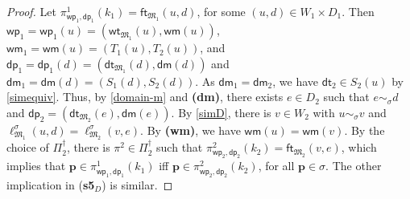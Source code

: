 \documentclass{lmcs} %
\theoremstyle{plain}\newtheorem{satz}[thm]{Satz} %
\newcommand{\wt}{\mathsf{wt}}
\newcommand{\dt}{\mathsf{dt}}
\newcommand{\ft}{\mathsf{ft}}
\newcommand{\wm}{\mathsf{wm}}
\newcommand{\dm}{\mathsf{dm}}
\newcommand{\iwp}{\mathsf{wp}_i}
\newcommand{\idp}{\mathsf{dp}_i}
\newcommand{\owp}{\mathsf{wp}_1}
\newcommand{\twp}{\mathsf{wp}_2}
\newcommand{\odp}{\mathsf{dp}_1}
\newcommand{\tdp}{\mathsf{dp}_2}
\newcommand{\fform}[1]{\boldsymbol{#1}}
\newcommand{\pvar}{\fform{p}}
\begin{document}
\begin{proof}
	Let $\pi^1_{\owp,\odp}(k_1) = \ft_{\mathfrak{M}_{1}}(u,d)$, for some $(u,d)\in W_{1} \times D_{1}$. Then $\owp = \owp(u) = (\wt_{\mathfrak M_1}(u), \wm(u) )$, $\wm_1 = \wm(u) = (T_1(u), T_2(u))$, and $\odp = \odp(d) = (\dt_{\mathfrak M_1}(d), \dm(d) )$ and $\dm_1 = \dm(d) = (S_1(d), S_2(d))$. 
As $\dm_1 = \dm_2$, we have $\dt_2 \in S_2(u)$ by \eqref{simequiv}. Thus, by \eqref{domain-m} and  {\bf (dm)}, 
	there exists $e \in D_{2}$ such that $e\sim_{\sigma} d$ and $\tdp = (\dt_{\mathfrak M_2}(e), \dm(e) )$.
	By \eqref{simD}, 
	there is $v \in W_2$ with $u \sim_\sigma v$ and $\ell^\sigma_{\mathfrak M_1}(u,d)= \ell^\sigma_{\mathfrak M_2}(v,e)$. By {\bf (wm)}, we have $\wm(u) = \wm(v)$. By the choice of $\Pi_{2}^{\dag}$, there is $\pi^{2}\in \Pi_{2}^{\dag}$ such that $\pi^2_{\twp,\tdp}(k_2) = \ft_{\mathfrak M_2}(v,e)$, which implies that $\pvar \in \pi^1_{\owp,\odp}(k_1)$ iff $\pvar \in \pi^2_{\twp,\tdp}(k_2)$, for all $\pvar \in \sigma$.
	The other implication in (\textbf{s5}$_D$) is similar.
\end{proof}

%
%
%
\end{document}
